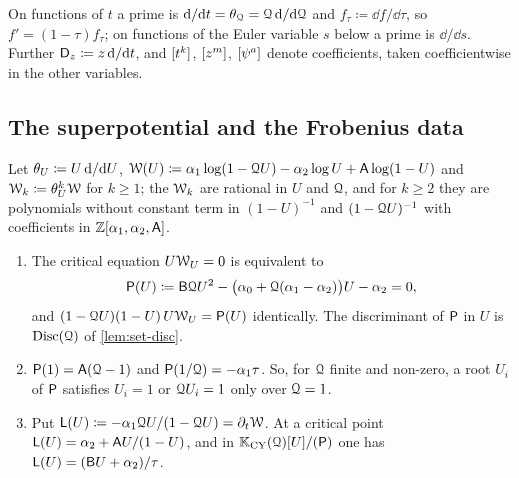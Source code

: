 On functions of $t$ a prime is $\mathrm{d}/\mathrm{d} t=\theta_{\mathcal{Q}}=\mathcal{Q}\,\mathrm{d}/\mathrm{d}\mathcal{Q}$ and $f_\tau\coloneqq\dd f/\dd\tau$, so $f'=(1-\tau)f_\tau$; on functions of the Euler variable $s$ below a prime is $\dd/\dd s$. Further $\mathsf{D}_{z}\coloneqq z\,\mathrm{d}/\mathrm{d} t$, and $[t^k]$, $[z^m]$, $[\psi^a]$ denote coefficients, taken coefficientwise in the other variables.

\subsection{The superpotential and the Frobenius data}
\label{sec:set-crit}

\begin{lem}
\label{lem:set-crit}
Let $\theta_{U}\coloneqq U\,\mathrm{d}/\mathrm{d} U$, $\mathcal{W}(U)\coloneqq\alpha_1\log(1-\mathcal{Q} U)-\alpha_2\log U+\mathsf{A}\log(1-U)$ and $\mathcal{W}_k\coloneqq\theta_{U}^k\mathcal{W}$ for $k\geq1$; the $\mathcal{W}_k$ are rational in $U$ and $\mathcal{Q}$, and for $k\geq2$ they are polynomials without constant term in $(1-U)^{-1}$ and $(1-\mathcal{Q} U)^{-1}$ with coefficients in $\mathbb{Z}[\alpha_1,\alpha_2,\mathsf{A}]$.
\begin{enumerate}
\item The critical equation $U\mathcal{W}_U=0$ is equivalent to
\begin{equation}
\label{eq:set-P}
\mathsf{P}(U)\coloneqq\mathsf{B}\mathcal{Q} U^2-\big(\alpha_0+\mathcal{Q}(\alpha_1-\alpha_2)\big)U-\alpha_2=0 ,
\end{equation}
and $(1-\mathcal{Q} U)(1-U)\,U\mathcal{W}_U=\mathsf{P}(U)$ identically. The discriminant of $\mathsf{P}$ in $U$ is $\operatorname{Disc}(\mathcal{Q})$ of \cref{lem:set-disc}.
\item $\mathsf{P}(1)=\mathsf{A}(\mathcal{Q}-1)$ and $\mathsf{P}(1/\mathcal{Q})=-\alpha_1\tau$. So, for $\mathcal{Q}$ finite and non-zero, a root $U_i$ of $\mathsf{P}$ satisfies $U_i=1$ or $\mathcal{Q} U_i=1$ only over $\mathcal{Q}=1$.
\item Put $\mathsf{L}(U)\coloneqq-\alpha_1\mathcal{Q} U/(1-\mathcal{Q} U)=\partial_t\mathcal{W}$. At a critical point $\mathsf{L}(U)=\alpha_2+\mathsf{A} U/(1-U)$, and in $\mathbb{K}_{\mathrm{CY}}(\mathcal{Q})[U]/(\mathsf{P})$ one has $\mathsf{L}(U)=(\mathsf{B} U+\alpha_2)/\tau$.
\end{enumerate}
\end{lem}

